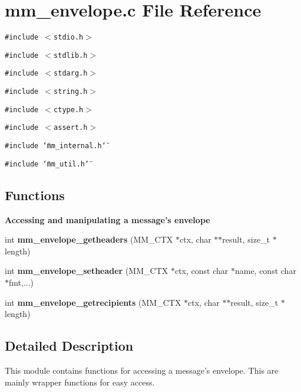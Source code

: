 \section{mm\_\-envelope.c File Reference}
\label{mm__envelope_8c}
{\tt \#include $<$stdio.h$>$}\par
{\tt \#include $<$stdlib.h$>$}\par
{\tt \#include $<$stdarg.h$>$}\par
{\tt \#include $<$string.h$>$}\par
{\tt \#include $<$ctype.h$>$}\par
{\tt \#include $<$assert.h$>$}\par
{\tt \#include \char`\"{}mm\_\-internal.h\char`\"{}}\par
{\tt \#include \char`\"{}mm\_\-util.h\char`\"{}}\par
\subsection*{Functions}
\begin{Indent}{\bf Accessing and manipulating a message's envelope}\par
\begin{CompactItemize}
\item 
int {\bf mm\_\-envelope\_\-getheaders} (MM\_\-CTX $\ast$ctx, char $\ast$$\ast$result, size\_\-t $\ast$length)
\item 
int {\bf mm\_\-envelope\_\-setheader} (MM\_\-CTX $\ast$ctx, const char $\ast$name, const char $\ast$fmt,...)
\item 
int {\bf mm\_\-envelope\_\-getrecipients} (MM\_\-CTX $\ast$ctx, char $\ast$$\ast$result, size\_\-t $\ast$length)
\end{CompactItemize}
\end{Indent}


\subsection{Detailed Description}
This module contains functions for accessing a message's envelope. This are mainly wrapper functions for easy access. 